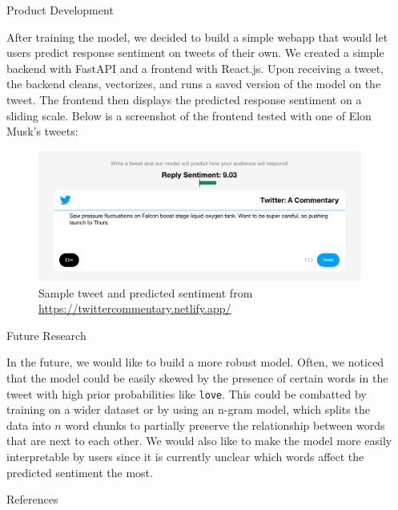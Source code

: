 \documentclass[final]{beamer}
\def\code#1{\texttt{#1}}
\newlength{\sepwidth}
\newlength{\colwidth}
\newcommand{\separatorcolumn}{\begin{column}{\sepwidth}\end{column}}
\begin{document}
\begin{frame}[t]
\begin{columns}[t]
\begin{column}{\colwidth}
  \begin{block}{Product Development}

    After training the model, we decided to build a simple webapp that would let users predict response sentiment on tweets of their own. We created a simple backend with FastAPI and a frontend with React.js. Upon receiving a tweet, the backend cleans, vectorizes, and runs a saved version of the model on the tweet. The frontend then displays the predicted response sentiment on a sliding scale. Below is a screenshot of the frontend tested with one of Elon Musk's tweets:

    \begin{figure}[H]
      \centering
      \includegraphics[width=1\textwidth]{product.png}
      \caption{Sample tweet and predicted sentiment from \href{https://twittercommentary.netlify.app/}{https://twittercommentary.netlify.app/}}
    \end{figure}

  \end{block}

  \begin{block}{Future Research}

    In the future, we would like to build a more robust model. Often, we noticed that the model could be easily skewed by the presence of certain words in the tweet with high prior probabilities like \code{love}. This could be combatted by training on a wider dataset or by using an n-gram model, which splits the data into $n$ word chunks to partially preserve the relationship between words that are next to each other. We would also like to make the model more easily interpretable by users since it is currently unclear which words affect the predicted sentiment the most.
  
  \end{block}

  \begin{block}{References}

    \footnotesize{}

  \end{block}

\end{column}

\separatorcolumn
\end{columns}
\end{frame}
\end{document}
